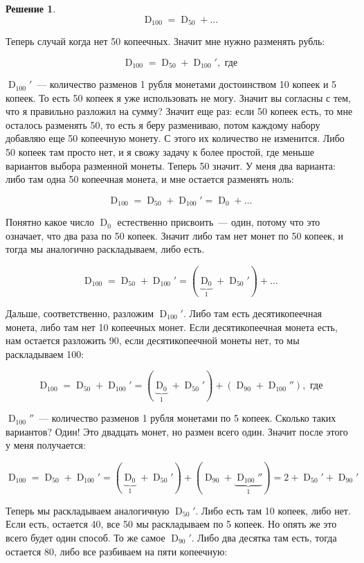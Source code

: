 \documentclass[russian]{lecture-notes}
\theoremstyle{definition}
\newtheorem*{solution}{Решение}
\DeclareMathOperator{\KRAZ}{D}
\newcommand{\DN}[1]{\KRAZ_{#1}}
\begin{document}
\begin{enumerate}
\begin{solution}
			\[
				\DN{100} = \DN{50} + \ldots
			\]
			
			Теперь случай когда нет 50 копеечных. Значит мне нужно разменять рубль:
			
			\[
				\DN{100} = \DN{50} + \DN{100}', \text{ где}
			\]
			
			 $\DN{100}'$~--- количество разменов 1 рубля монетами достоинством 10 копеек и 5 копеек. То есть 50 копеек я уже использовать не могу. Значит вы согласны с тем, что я правильно разложил на сумму? Значит еще раз: если 50 копеек есть, то мне осталось разменять 50, то есть я беру размениваю, потом каждому набору добавляю еще 50 копеечную монету. С этого их количество не изменится. Либо 50 копеек там просто нет, и я свожу задачу к более простой, где меньше вариантов выбора разменной монеты. Теперь 50 значит. У меня два варианта: либо там одна 50 копеечная монета, и мне остается разменять ноль:
			 
			 \[
			 	\DN{100} = \DN{50} + \DN{100}' = \DN{0} + \ldots
			 \]
			 
			 Понятно какое число $\DN{0}$ естественно присвоить~--- один, потому что это означает, что два раза по 50 копеек. Значит либо там нет монет по 50 копеек, и тогда мы аналогично раскладываем, либо есть.
			 
			 \[
			 	\DN{100} = \DN{50} + \DN{100}' = (\underbrace{\DN{0}}_{1} + \DN{50}') + \ldots
			 \]
			 
			 Дальше, соответственно, разложим $\DN{100}'$. Либо там есть десятикопеечная монета, либо там нет 10 копеечных монет. Если десятикопеечная монета есть, нам остается разложить 90, если десятикопеечной монеты нет, то мы раскладываем 100:
			 
			 \[
			 	\DN{100} = \DN{50} + \DN{100}' = (\underbrace{\DN{0}}_{1} + \DN{50}') + (\DN{90} + \DN{100}''), \text{ где}
			 \]
			 
			 $\DN{100}''$~--- количество разменов 1 рубля монетами по 5 копеек. Сколько таких вариантов? Один! Это двадцать монет, но размен всего один. Значит после этого у меня получается:
			 
			 \[
				 \DN{100} = \DN{50} + \DN{100}' = (\underbrace{\DN{0}}_{1} + \DN{50}') + (\DN{90} + \underbrace{\DN{100}''}_{1}) = 2 + \DN{50}' + \DN{90}'
			 \]
			 
			 Теперь мы раскладываем аналогичную $\DN{50}'$. Либо есть там 10 копеек, либо нет. Если есть, остается 40, все 50 мы раскладываем по 5 копеек. Но опять же это всего будет один способ. То же самое $\DN{90}'$. Либо два десятка там есть, тогда остается 80, либо все разбиваем на пяти копеечную:
			 

\end{solution}
\end{enumerate}
\end{document}
